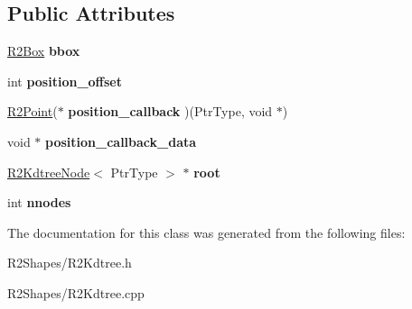 \subsection*{Public Attributes}
\begin{DoxyCompactItemize}
\item 
\hyperlink{class_r2_box}{R2\+Box} {\bfseries bbox}\hypertarget{class_r2_kdtree_aab807d54e7a80ecbf7c9c9e51ae58871}{}\label{class_r2_kdtree_aab807d54e7a80ecbf7c9c9e51ae58871}

\item 
int {\bfseries position\+\_\+offset}\hypertarget{class_r2_kdtree_abe9a34a70a6455a573807217d285db22}{}\label{class_r2_kdtree_abe9a34a70a6455a573807217d285db22}

\item 
\hyperlink{class_r2_point}{R2\+Point}($\ast$ {\bfseries position\+\_\+callback} )(Ptr\+Type, void $\ast$)\hypertarget{class_r2_kdtree_acc743cf480aa0fccb3d09060de0b76da}{}\label{class_r2_kdtree_acc743cf480aa0fccb3d09060de0b76da}

\item 
void $\ast$ {\bfseries position\+\_\+callback\+\_\+data}\hypertarget{class_r2_kdtree_aa00a4629ca872cb0f7849832914d2bef}{}\label{class_r2_kdtree_aa00a4629ca872cb0f7849832914d2bef}

\item 
\hyperlink{class_r2_kdtree_node}{R2\+Kdtree\+Node}$<$ Ptr\+Type $>$ $\ast$ {\bfseries root}\hypertarget{class_r2_kdtree_a14b57e4481549374189c97fa9dc7c1c0}{}\label{class_r2_kdtree_a14b57e4481549374189c97fa9dc7c1c0}

\item 
int {\bfseries nnodes}\hypertarget{class_r2_kdtree_a4f4a8f4b6dd5ddab7ca69521c6f06539}{}\label{class_r2_kdtree_a4f4a8f4b6dd5ddab7ca69521c6f06539}

\end{DoxyCompactItemize}


The documentation for this class was generated from the following files\+:\begin{DoxyCompactItemize}
\item 
R2\+Shapes/R2\+Kdtree.\+h\item 
R2\+Shapes/R2\+Kdtree.\+cpp\end{DoxyCompactItemize}
